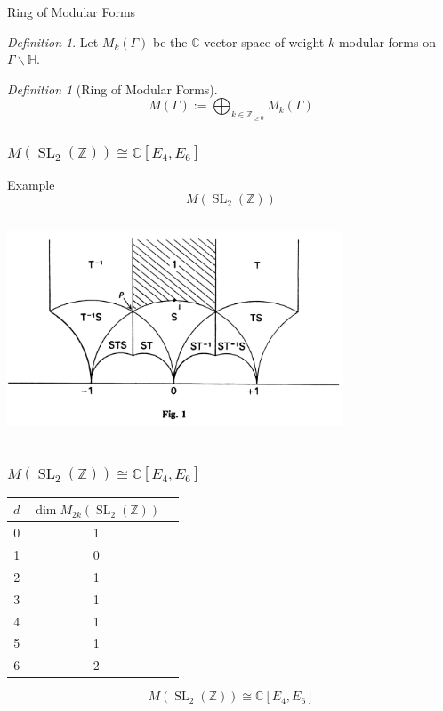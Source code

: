 \documentclass{beamer}
\theoremstyle{remark}
\newtheorem{defn}[thm]{Definition}
\newcommand\BC{{\mathbb C}}
\newcommand\BBZ{{\mathbb Z}}
\newcommand\BZ{{\mathbb Z}}
\newcommand{\SL}{\operatorname{SL}}
\begin{document}

\begin{frame}{Ring of Modular Forms}

\begin{defn}
  Let $M_k(\Gamma)$ be the $\BC$-vector space of weight $k$ modular forms on $\Gamma \backslash \mathbb{H}$.
\end{defn}

\begin{defn}[Ring of Modular Forms]
\[
	M(\Gamma) := \bigoplus_{k \in \BZ_{\geq 0}} M_k(\Gamma)
\]
\end{defn}

\end{frame}


\begin{frame}
\frametitle{$M(\SL_2(\BZ)) \cong \BC[E_4,E_6]$}

\begin{block}{Example}
\[
	M(\SL_2(\BZ))
\]
\end{block}

  \begin{center}
    \includegraphics[width=10cm, height=6.5cm]{pics/fun-domain-SL2.png}
  \end{center}

\end{frame}


\begin{frame}
\frametitle{$M(\SL_2(\BZ)) \cong \BC[E_4,E_6]$}


\begin{center}
\begin{tabular}{ |c| c| c|}
\hline
$d$  & $\dim M_{2k}(\SL_2(\BBZ))$  \\ 
\hline
0& 1 \\ 
1& 0 \\  
2& 1  \\
3& 1  \\
4& 1  \\
5& 1  \\
6& 2   \\
\hline
\end{tabular}
\end{center}

\[
	M(\SL_2(\BZ)) \cong \BC[E_4,E_6]
\]
\end{frame}
\end{document}
